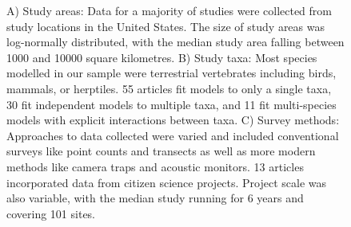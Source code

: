 \documentclass[
]{article}
\begin{document}
\begin{figure}


\caption{\label{fig-StudyDetails}A) Study areas: Data for a majority of
studies were collected from study locations in the United States. The
size of study areas was log-normally distributed, with the median study
area falling between 1000 and 10000 square kilometres. B) Study taxa:
Most species modelled in our sample were terrestrial vertebrates
including birds, mammals, or herptiles. 55 articles fit models to only a
single taxa, 30 fit independent models to multiple taxa, and 11 fit
multi-species models with explicit interactions between taxa. C) Survey
methods: Approaches to data collected were varied and included
conventional surveys like point counts and transects as well as more
modern methods like camera traps and acoustic monitors. 13 articles
incorporated data from citizen science projects. Project scale was also
variable, with the median study running for 6 years and covering 101
sites.}

\end{figure}%
\end{document}
